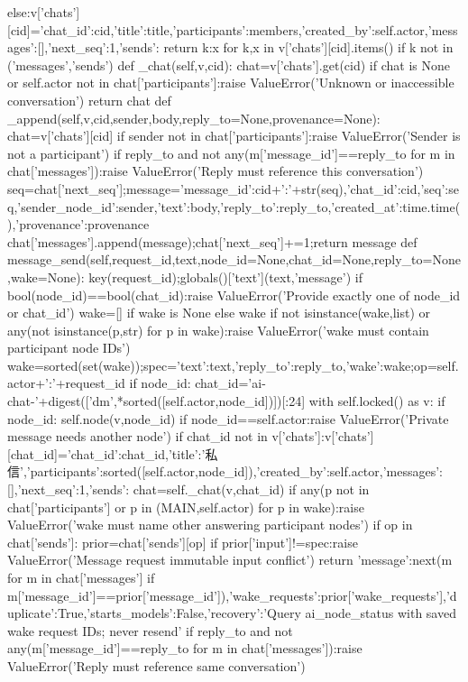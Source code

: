    else:v['chats'][cid]={'chat_id':cid,'title':title,'participants':members,'created_by':self.actor,'messages':[],'next_seq':1,'sends':{}}
   return {k:x for k,x in v['chats'][cid].items() if k not in ('messages','sends')}
 def _chat(self,v,cid):
  chat=v['chats'].get(cid)
  if chat is None or self.actor not in chat['participants']:raise ValueError('Unknown or inaccessible conversation')
  return chat
 def _append(self,v,cid,sender,body,reply_to=None,provenance=None):
  chat=v['chats'][cid]
  if sender not in chat['participants']:raise ValueError('Sender is not a participant')
  if reply_to and not any(m['message_id']==reply_to for m in chat['messages']):raise ValueError('Reply must reference this conversation')
  seq=chat['next_seq'];message={'message_id':cid+':'+str(seq),'chat_id':cid,'seq':seq,'sender_node_id':sender,'text':body,'reply_to':reply_to,'created_at':time.time(),'provenance':provenance}
  chat['messages'].append(message);chat['next_seq']+=1;return message
 def message_send(self,request_id,text,node_id=None,chat_id=None,reply_to=None,wake=None):
  key(request_id);globals()['text'](text,'message')
  if bool(node_id)==bool(chat_id):raise ValueError('Provide exactly one of node_id or chat_id')
  wake=[] if wake is None else wake
  if not isinstance(wake,list) or any(not isinstance(p,str) for p in wake):raise ValueError('wake must contain participant node IDs')
  wake=sorted(set(wake));spec={'text':text,'reply_to':reply_to,'wake':wake};op=self.actor+':'+request_id
  if node_id:
   chat_id='ai-chat-'+digest(['dm',*sorted([self.actor,node_id])])[:24]
  with self.locked() as v:
   if node_id:
    self.node(v,node_id)
    if node_id==self.actor:raise ValueError('Private message needs another node')
    if chat_id not in v['chats']:v['chats'][chat_id]={'chat_id':chat_id,'title':'私信','participants':sorted([self.actor,node_id]),'created_by':self.actor,'messages':[],'next_seq':1,'sends':{}}
   chat=self._chat(v,chat_id)
   if any(p not in chat['participants'] or p in (MAIN,self.actor) for p in wake):raise ValueError('wake must name other answering participant nodes')
   if op in chat['sends']:
    prior=chat['sends'][op]
    if prior['input']!=spec:raise ValueError('Message request immutable input conflict')
    return {'message':next(m for m in chat['messages'] if m['message_id']==prior['message_id']),'wake_requests':prior['wake_requests'],'duplicate':True,'starts_models':False,'recovery':'Query ai_node_status with saved wake request IDs; never resend'}
   if reply_to and not any(m['message_id']==reply_to for m in chat['messages']):raise ValueError('Reply must reference same conversation')
